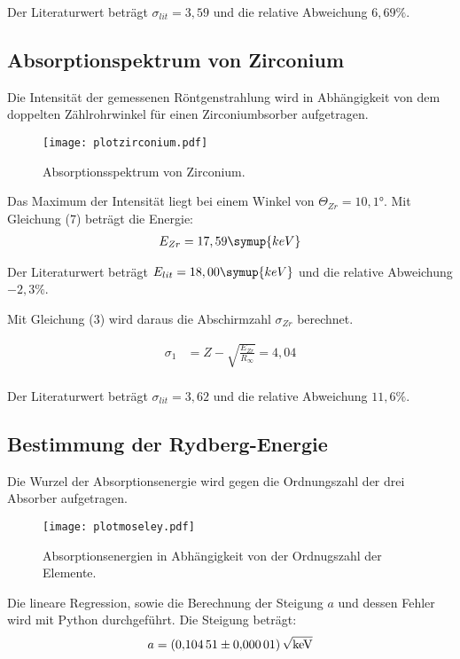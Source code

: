 Der Literaturwert beträgt $\sigma_{lit} = 3,59$ und die relative Abweichung $6,69\%$.


\subsection{Absorptionspektrum von Zirconium}

Die Intensität der gemessenen Röntgenstrahlung wird in Abhängigkeit von dem doppelten Zählrohrwinkel für
einen Zirconiumbsorber aufgetragen.

\begin{figure}[H]
  \centering
  \texttt{[image: plotzirconium.pdf]}
  \caption{Absorptionsspektrum von Zirconium.}
  \label{fig:plot}
\end{figure}


Das Maximum der Intensität liegt bei einem Winkel von $\Theta_{Zr} = 10,1°$.
Mit Gleichung (7) beträgt die Energie:
\begin{align*}
  E_{Zr} = 17,59 \symup{keV}
\end{align*}

Der Literaturwert beträgt $E_{lit} = 18,00 \symup{keV}$ und die relative Abweichung $-2,3\%$.

Mit Gleichung (3) wird daraus die Abschirmzahl $\sigma_{Zr}$  berechnet.

\begin{align*}
  \sigma_1 &= Z - \sqrt{\frac{E_{Zr}}{R_{\infty}}} = 4,04 \\
\end{align*}

Der Literaturwert beträgt $\sigma_{lit} = 3,62$ und die relative Abweichung $11,6\%$.


\subsection{Bestimmung der Rydberg-Energie}

Die Wurzel der Absorptionsenergie wird gegen die Ordnungszahl der drei Absorber aufgetragen.

\begin{figure}[H]
  \centering
  \texttt{[image: plotmoseley.pdf]}
  \caption{Absorptionsenergien in Abhängigkeit von der Ordnugszahl der Elemente.}
  \label{fig:plot}
\end{figure}

Die lineare Regression, sowie die Berechnung der Steigung $a$ und dessen Fehler wird mit Python durchgeführt.
Die Steigung beträgt:
\begin{align*}
  a = \SI{0.10451(1)}{\sqrt{\kilo\eV}}
\end{align*}

